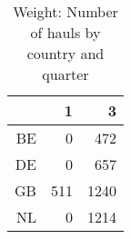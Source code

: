 \begin{table}[ht]
\centering
\begin{tabular}{rrr}
  \hline
 & 1 & 3 \\ 
  \hline
BE & 0 & 472 \\ 
  DE & 0 & 657 \\ 
  GB & 511 & 1240 \\ 
  NL & 0 & 1214 \\ 
   \hline
\end{tabular}
\caption{Weight: Number of hauls by country and quarter} 
\end{table}

